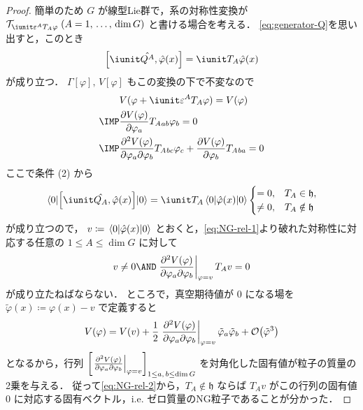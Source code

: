 \documentclass[TQFT_main]{subfiles}
\begin{document}
\begin{proof}
    簡単のため $G$ が線型Lie群で，系の対称性変換が $\mathcal{T}_{\iunit \varepsilon^A T_A \varphi}\; (A = 1,\, \dots,\, \dim G)$ と書ける場合を考える．
    \eqref{eq:generator-Q}を思い出すと，このとき
    \begin{align}
        \comm{\iunit \hat{Q^A}}{\hat{\varphi}(x)} = \iunit T_A \hat{\varphi}(x)
    \end{align}
    が成り立つ．    
    $\Gamma[\varphi],\, V[\varphi]$ もこの変換の下で不変なので
    \begin{align}
        &V(\varphi + \iunit \varepsilon^A T_A \varphi) = V(\varphi) \\
        \IMP &\pdv{V(\varphi)}{\varphi_a} T_A{}_{ab} \varphi_b = 0 \\
        \IMP &\pdv[2]{V(\varphi)}{\varphi_a}{\varphi_b} T_A{}_{bc} \varphi_c + \pdv{V(\varphi)}{\varphi_b} T_A{}_{ba} = 0 \label{eq:NG-rel-1}
    \end{align}
    ここで条件 (2) から
    \begin{align}
        \mel{0}{\comm{\iunit \hat{Q_A}}{\hat{\varphi}(x)}}{0} = \iunit T_A \mel{0}{\hat{\varphi}(x)}{0}
        \begin{cases}
            =0, &T_A \in \mathfrak{h},  \\
            \neq 0, &T_A \notin \mathfrak{h}
        \end{cases}
    \end{align}
    が成り立つので，
    $v \coloneqq \mel{0}{\hat{\varphi}(x)}{0}$ とおくと，\eqref{eq:NG-rel-1}より破れた対称性に対応する任意の $1 \le A \le \dim G$ に対して
    \begin{align}
        \label{eq:NG-rel-2}
        v \neq 0 \AND \eval{\pdv[2]{V(\varphi)}{\varphi_a}{\varphi_b}}_{\varphi = v} T_A v = 0
    \end{align}
    が成り立たねばならない．
    ところで，真空期待値が $0$ になる場を $\tilde{\varphi}(x) \coloneqq \varphi(x) - v$ で定義すると
    \begin{align}
        V(\varphi) = V(v) + \frac{1}{2} \eval{\pdv[2]{V(\varphi)}{\varphi_a}{\varphi_b}}_{\varphi = v} \tilde{\varphi}_a \tilde{\varphi}_b + \order{\tilde{\varphi}^3}
    \end{align}
    となるから，行列 $\left[\eval{\pdv[2]{V(\varphi)}{\varphi_a}{\varphi_b}}_{\varphi = v}\right]_{1 \le a,\, b \le \dim G}$ を対角化した固有値が粒子の質量の2乗を与える．
    従って\eqref{eq:NG-rel-2}から，$T_A \notin \mathfrak{h}$ ならば $T_A v$ がこの行列の固有値 $0$ に対応する固有ベクトル，i.e. ゼロ質量のNG粒子であることが分かった．
\end{proof}
\end{document}
